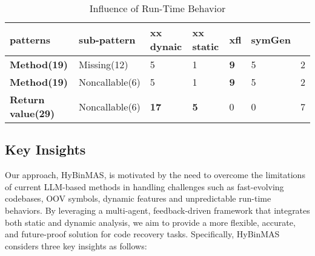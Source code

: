 \documentclass[acmsmall,screen,review,anonymous]{acmart} %
\begin{document}


\begin{table}[t]
  \centering
  \footnotesize
  \caption{Influence of Run-Time Behavior}
  \label{tab:dynamic_example}
  \renewcommand\arraystretch{1.15}
\begin{tabular}{p{1.7cm}p{1.7cm}p{1.2cm}p{1.2cm}p{1.2cm}p{1.2cm}p{1.2cm}}
\toprule
patterns & sub-pattern &xx dynaic &xx static & xfl &symGen    \\
\midrule
\textbf{Method(19)} & Missing(12) &5 &1 &\textbf{9} &5 &2 \\
\textbf{Method(19)} & Noncallable(6) &5 &1 &\textbf{9} &5 &2 \\
\textbf{Return value(29)} & Noncallable(6) &\textbf{17}&\textbf{5}&0&0&7\\
\bottomrule
\end{tabular}
\end{table}


\subsection{Key Insights}

Our approach, HyBinMAS, is motivated by the need to overcome the limitations of current LLM-based methods in handling challenges such as fast-evolving codebases, OOV symbols, dynamic features and  unpredictable run-time behaviors. By leveraging a multi-agent, feedback-driven framework that integrates both static and dynamic analysis, we aim to provide a more flexible, accurate, and future-proof solution for code recovery tasks. %
Specifically, HyBinMAS considers three key insights as follows:
\end{document}
